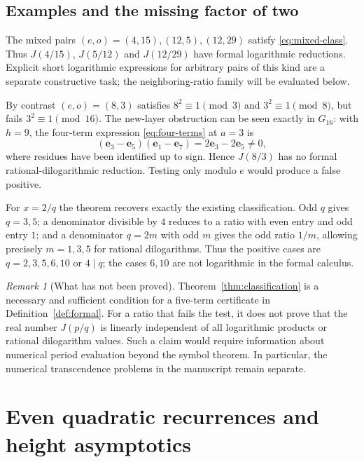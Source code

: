 \documentclass[11pt]{article}
\numberwithin{equation}{section}
\theoremstyle{definition}
\theoremstyle{remark}
\newtheorem{remark}[theorem]{Remark}
\newcommand{\ee}{\mathbf e}
\begin{document}
\subsection{Examples and the missing factor of two}

The mixed pairs $(e,o)=(4,15),(12,5),(12,29)$ satisfy
\eqref{eq:mixed-class}. Thus $J(4/15)$, $J(5/12)$ and $J(12/29)$ have
formal logarithmic reductions. Explicit short logarithmic expressions
for arbitrary pairs of this kind are a separate constructive task;
the neighboring-ratio family will be evaluated below.

By contrast $(e,o)=(8,3)$ satisfies
$8^2\equiv1\pmod3$ and $3^2\equiv1\pmod8$, but fails
$3^2\equiv1\pmod{16}$. The new-layer obstruction can be seen exactly
in $G_{16}$: with $h=9$, the four-term expression
\eqref{eq:four-terms} at $a=3$ is
\[
 (\ee_3-\ee_5)(\ee_1-\ee_7)=2\ee_3-2\ee_5\ne0,
\]
where residues have been identified up to sign. Hence $J(8/3)$ has no
formal rational-dilogarithmic reduction. Testing only modulo $e$ would
produce a false positive.

For $x=2/q$ the theorem recovers exactly the existing classification.
Odd $q$ gives $q=3,5$; a denominator divisible by $4$ reduces to a ratio
with even entry and odd entry $1$; and a denominator $q=2m$ with odd
$m$ gives the odd ratio $1/m$, allowing precisely $m=1,3,5$ for rational
dilogarithms. Thus the positive cases are $q=2,3,5,6,10$ or $4\mid q$;
the cases $6,10$ are not logarithmic in the formal calculus.

\begin{remark}[What has not been proved]\label{rem:periods}
Theorem~\ref{thm:classification} is a necessary and sufficient condition
for a five-term certificate in Definition~\ref{def:formal}. For a ratio
that fails the test, it does not prove that the real number $J(p/q)$ is
linearly independent of all logarithmic products or rational dilogarithm
values. Such a claim would require information about numerical period
evaluation beyond the symbol theorem. In particular, the numerical
transcendence problems in the manuscript remain separate.
\end{remark}


\section{Even quadratic recurrences and height asymptotics}
\label{sec:recurrences}
\end{document}
